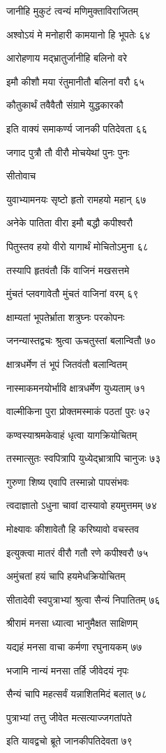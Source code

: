 जानीहि मुकुटं त्वन्यं मणिमुक्ताविराजितम्

अश्वोऽयं मे मनोहारी कामयानो हि भूपतेः ६४

आरोहणाय मद्भ्रातुर्जानीहि बलिनो वरे

इमौ कीशौ मया रंतुमानीतौ बलिनां वरौ ६५

कौतुकार्थं तवैवैतौ संग्रामे युद्धकारकौ

इति वाक्यं समाकर्ण्य जानकी पतिदेवता ६६

जगाद पुत्रौ तौ वीरौ मोचयेथां पुनः पुनः

सीतोवाच

युवाभ्यामनयः सृष्टो हृतो रामहयो महान् ६७

अनेके पातिता वीरा इमौ बद्धौ कपीश्वरौ

पितुस्तव हयो वीरो यागार्थं मोचितोऽमुना ६८

तस्यापि हृतवंतौ किं वाजिनं मखसत्तमे

मुंचतं प्लवगावेतौ मुंचतं वाजिनां वरम् ६९

क्षाम्यतां भूपतेर्भ्राता शत्रुघ्नः परकोपनः

जनन्यास्तद्वचः श्रुत्वा ऊचतुस्तां बलान्वितौ ७०

क्षात्रधर्मेण तं भूपं जितवंतौ बलान्वितम्

नास्माकमनयोर्भावि क्षात्रधर्मेण युध्यताम् ७१

वाल्मीकिना पुरा प्रोक्तमस्माकं पठतां पुरः ७२

कण्वस्याश्रमकेवाहं धृत्वा यागक्रियोचितम्

तस्मात्सुतः स्वपित्रापि युध्येद्भ्रात्रापि चानुजः ७३

गुरुणा शिष्य एवापि तस्मान्नो पापसंभवः

त्वदाज्ञातो ऽधुना चावां दास्यावो हयमुत्तमम् ७४

मोक्ष्यावः कीशावेतौ हि करिष्यावो वचस्तव

इत्युक्त्वा मातरं वीरौ गतौ रणे कपीश्वरौ ७५

अमुंचतां हयं चापि हयमेधक्रियोचितम्

सीतादेवी स्वपुत्राभ्यां श्रुत्वा सैन्यं निपातितम् ७६

श्रीरामं मनसा ध्यात्वा भानुमैक्षत साक्षिणम्

यद्यहं मनसा वाचा कर्मणा रघुनायकम् ७७

भजामि नान्यं मनसा तर्हि जीवेदयं नृपः

सैन्यं चापि महत्सर्वं यन्नाशितमिदं बलात् ७८

पुत्राभ्यां तत्तु जीवेत मत्सत्याज्जगतांपते

इति यावद्वचो ब्रूते जानकीपतिदेवता ७९

